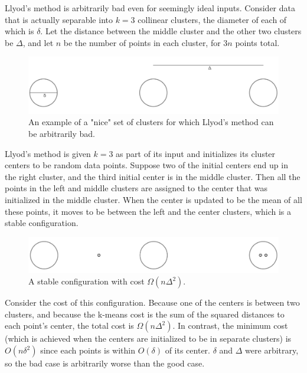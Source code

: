 \begin{example} 
Llyod's method is arbitrarily bad even for seemingly ideal inputs. Consider data that is actually separable into $k=3$ collinear clusters, the diameter of each of which is $\delta$. Let the distance between the middle cluster and the other two clusters be $\Delta$, and let $n$ be the number of points in each cluster, for $3n$ points total. 

\begin{figure}
	\centering
	\captionsetup{width=0.8\textwidth}
	\includegraphics[scale=0.6]{chapter_1/files/kmeans.png}
	\caption{An example of a "nice" set of clusters for which Llyod's method can be arbitrarily bad.}
	\label{fig:kmeans}
\end{figure}

Llyod's method is given $k=3$ as part of its input and initializes its
cluster centers to be random data points. Suppose two of the initial
centers end up in the right cluster, and the third initial center is
in the middle cluster. Then all the points in the left and middle
clusters are assigned to the center that was initialized in the middle
cluster. When the center is updated to be the mean of all these
points, it moves to be between the left and the center clusters, which
is a stable configuration. 

\begin{figure}
	\centering
	\captionsetup{width=0.8\textwidth}
	\includegraphics[scale=0.6]{chapter_1/files/stable-kmeans.png}
	\caption{A stable configuration with cost $\Omega(n\Delta^2)$.}
	\label{fig:kmeans}
\end{figure}

Consider the cost of this configuration. Because one of the centers is
between two clusters, and because the k-means cost is the sum of the
squared distances to each point's center, the total cost is
$\Omega(n\Delta^2)$. In contrast, the minimum cost (which is achieved
when the centers are initialized to be in separate clusters) is
$O(n\delta^2)$ since each points is within $O(\delta)$ of its center.
$\delta$ and $\Delta$ were arbitrary, so the bad case is arbitrarily
worse than the good case.
\end{example}




